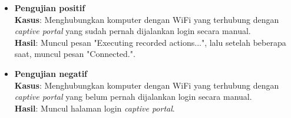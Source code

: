 \begin{itemize}
{        \begin{itemize}
            \item{
                \textbf{Pengujian positif}\\
                \textbf{Kasus}: Menghubungkan komputer dengan WiFi yang terhubung dengan \textit{captive portal} yang sudah pernah dijalankan login secara manual.\\
                \textbf{Hasil}: Muncul pesan "Executing recorded actions...", lalu setelah beberapa saat, muncul pesan "Connected.".
            }
            \item{
                \textbf{Pengujian negatif}\\
                \textbf{Kasus}: Menghubungkan komputer dengan WiFi yang terhubung dengan \textit{captive portal} yang belum pernah dijalankan login secara manual.\\
                \textbf{Hasil}: Muncul halaman login \textit{captive portal}.
            }
        \end{itemize}
    }
\end{itemize}